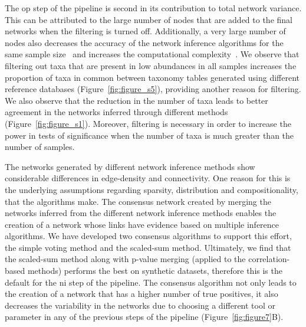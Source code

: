   The \ac{op} step of the pipeline is second in its contribution to total network variance.
  This can be attributed to the large number of nodes that are added to the final networks when the filtering is turned off.
  Additionally, a very large number of nodes also decreases the accuracy of the network inference algorithms for the same sample size~\cite{peschelNetCoMiNetworkConstruction2020} and increases the computational complexity~\cite{tackmannRapidInferenceDirect2019}.
  We observe that filtering out taxa that are present in low abundances in all samples increases the proportion of taxa in common between taxonomy tables generated using different reference databases (Figure~\ref{fig:figure_s5}), providing another reason for filtering.
  We also observe that the reduction in the number of taxa leads to better agreement in the networks inferred through different methods (Figure~\ref{fig:figure_s1}).
  Moreover, filtering is necessary in order to increase the power in tests of significance when the number of taxa is much greater than the number of samples.

  The networks generated by different network inference methods show considerable differences in edge-density and connectivity.
  One reason for this is the underlying assumptions regarding sparsity, distribution and compositionality, that the algorithms make.
  The consensus network created by merging the networks inferred from the different network inference methods enables the creation of a network whose links have evidence based on multiple inference algorithms.
  We have developed two consensus algorithms to support this effort, the simple voting method and the scaled-sum method.
  Ultimately, we find that the scaled-sum method along with p-value merging (applied to the correlation-based methods) performs the best on synthetic datasets, therefore this is the default for the \ac{ni} step of the pipeline.
  The consensus algorithm not only leads to the creation of a network that has a higher number of true positives, it also decreases the variability in the networks due to choosing a different tool or parameter in any of the previous steps of the pipeline (Figure~\ref{fig:figure7}B).

